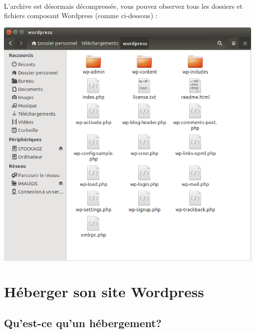 \documentclass[10pt,a4paper]{article}
\begin{document}
\paragraph{}L'archive est désormais décompressée, vous pouvez observez tous les dossiers et fichiers composant Wordpress (comme ci-dessous) :
\begin{center}
\includegraphics[scale=0.4]{img/0005.png}
\end{center}
\newpage

\section{Héberger son site Wordpress}
\subsection{Qu'est-ce qu'un hébergement?}
\end{document}
